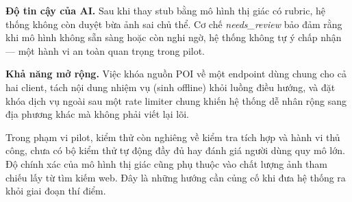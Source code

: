 \textbf{Độ tin cậy của AI.} Sau khi thay stub bằng mô hình thị giác có
rubric, hệ thống không còn duyệt bừa ảnh sai chủ thể. Cơ chế
\textit{needs\_review} bảo đảm rằng khi mô hình không sẵn sàng hoặc còn
nghi ngờ, hệ thống không tự ý chấp nhận --- một hành vi an toàn quan trọng
trong pilot.

\textbf{Khả năng mở rộng.} Việc khóa nguồn POI về một endpoint dùng chung
cho cả hai client, tách nội dung nhiệm vụ (sinh offline) khỏi luồng điều
hướng, và đặt khóa dịch vụ ngoài sau một rate limiter chung khiến hệ
thống dễ nhân rộng sang địa phương khác mà không phải viết lại lõi.

\begin{note}
Trong phạm vi pilot, kiểm thử còn nghiêng về kiểm tra tích hợp và hành vi
thủ công, chưa có bộ kiểm thử tự động đầy đủ hay đánh giá người dùng quy
mô lớn. Độ chính xác của mô hình thị giác cũng phụ thuộc vào chất lượng
ảnh tham chiếu lấy từ tìm kiếm web. Đây là những hướng cần củng cố khi
đưa hệ thống ra khỏi giai đoạn thí điểm.
\end{note}
